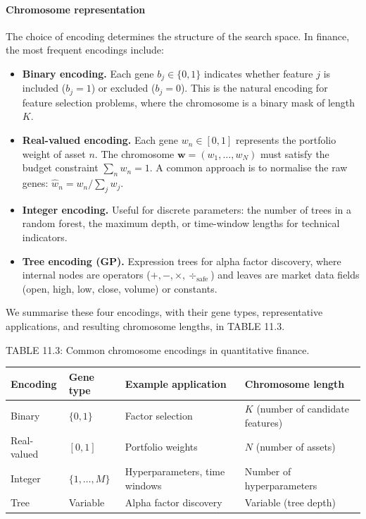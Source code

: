\paragraph{Chromosome representation}

The choice of encoding determines the structure of the search space. In finance, the most frequent encodings include:

\begin{itemize}
\item \textbf{Binary encoding.} Each gene $b_j \in \{0, 1\}$ indicates whether feature $j$ is included ($b_j = 1$) or excluded ($b_j = 0$). This is the natural encoding for feature selection problems, where the chromosome is a binary mask of length $K$.
\item \textbf{Real-valued encoding.} Each gene $w_n \in [0, 1]$ represents the portfolio weight of asset $n$. The chromosome $\mathbf{w} = (w_1, \ldots, w_N)$ must satisfy the budget constraint $\sum_n w_n = 1$. A common approach is to normalise the raw genes: $\hat{w}_n = w_n / \sum_j w_j$.
\item \textbf{Integer encoding.} Useful for discrete parameters: the number of trees in a random forest, the maximum depth, or time-window lengths for technical indicators.
\item \textbf{Tree encoding (GP).} Expression trees for alpha factor discovery, where internal nodes are operators ($+, -, \times, \div_{\text{safe}}$) and leaves are market data fields (open, high, low, close, volume) or constants.
\end{itemize}

We summarise these four encodings, with their gene types, representative applications, and resulting chromosome lengths, in TABLE 11.3.

TABLE 11.3: Common chromosome encodings in quantitative finance.

\bigskip\noindent
\begin{tabular}{p{}p{}p{}p{}}
\toprule
Encoding & Gene type & Example application & Chromosome length \\
\hline
Binary & $\{0, 1\}$ & Factor selection & $K$ (number of candidate features) \\
Real-valued & $[0, 1]$ & Portfolio weights & $N$ (number of assets) \\
Integer & $\{1, \ldots, M\}$ & Hyperparameters, time windows & Number of hyperparameters \\
Tree & Variable & Alpha factor discovery & Variable (tree depth) \\
\bottomrule
\end{tabular}

